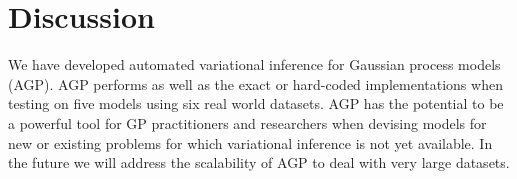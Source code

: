 \section{Discussion}
We have developed automated variational inference for Gaussian process models (AGP). 
AGP performs as well as the  exact or hard-coded implementations when testing on five models using six real world datasets.
%
AGP has the potential to be a powerful tool for  GP practitioners and researchers 
when devising models for new or existing problems for which variational inference 
is not yet available.
In the future we will address the scalability of 
AGP to deal  with very large datasets.
